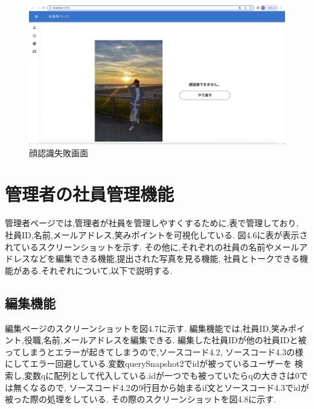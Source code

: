 \clearpage

\begin{figure}[!h]
	\begin{center}
			\includegraphics[scale=0.3, clip]{./img/sample5.png}
			\caption{顔認識失敗画面}
			\label{fig:図の名前}
	\end{center}
\end{figure}

\section{管理者の社員管理機能}
\label{chp:tex_admin}
管理者ページでは,管理者が社員を管理しやすくするために,表で管理しており,
社員ID,名前,メールアドレス,笑みポイントを可視化している.
図4.6に表が表示されているスクリーンショットを示す.
その他に,それぞれの社員の名前やメールアドレスなどを編集できる機能,提出された写真を見る機能,
社員とトークできる機能がある.それぞれについて,以下で説明する.

\subsection{編集機能}
編集ページのスクリーンショットを図4.7に示す.
編集機能では,社員ID,笑みポイント,役職,名前,メールアドレスを編集できる.
編集した社員IDが他の社員IDと被ってしまうとエラーが起きてしまうので,ソースコード4.2,
ソースコード4.3の様にしてエラー回避している.変数querySnapshot2でidが被っているユーザーを
検索し,変数qに配列として代入している.idが一つでも被っていたらqの大きさは0では無くなるので,
ソースコード4.2の9行目から始まるif文とソースコード4.3でidが被った際の処理をしている.
その際のスクリーンショットを図4.8に示す.

\clearpage

